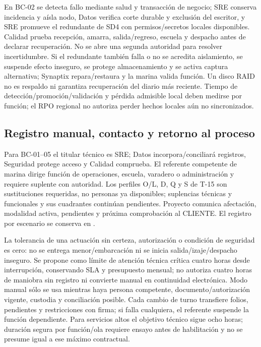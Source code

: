 En BC-02 se detecta fallo mediante salud y transacción de negocio; SRE conserva incidencia y aísla nodo, Datos verifica corte durable y exclusión del escritor, y SRE promueve el redundante de SD4 con permisos/secretos locales disponibles. Calidad prueba recepción, amarra, salida/regreso, escuela y despacho antes de declarar recuperación. No se abre una segunda autoridad para resolver incertidumbre. Si el redundante también falla o no se acredita aislamiento, se suspende efecto inseguro, se protege almacenamiento y se activa captura alternativa; Synaptix repara/restaura y la marina valida función. Un disco RAID no es respaldo ni garantiza recuperación del diario más reciente. Tiempo de detección/promoción/validación y pérdida admisible local deben medirse por función; el RPO regional no autoriza perder hechos locales aún no sincronizados.

\subsection{Registro manual, contacto y retorno al proceso}\label{sec:sd8-bcp-manual-p07}
Para BC-01--05 el titular técnico es SRE; Datos incorpora/conciliará registros, Seguridad protege acceso y Calidad comprueba. El referente competente de marina dirige función de operaciones, escuela, varadero o administración y requiere suplente con autoridad. Los perfiles O/L, D, Q y S de T-15 son sustituciones requeridas, no personas ya disponibles; suplencias técnicas y funcionales y sus cuadrantes continúan pendientes. Proyecto comunica afectación, modalidad activa, pendientes y próxima comprobación al CLIENTE. El registro por escenario se conserva en .

La tolerancia de una actuación sin certeza, autorización o condición de seguridad es cero: no se entrega menor/embarcación ni se inicia salida/izaje/despacho inseguro. Se propone como límite de atención técnica crítica cuatro horas desde interrupción, conservando SLA y presupuesto mensual; no autoriza cuatro horas de maniobra sin registro ni convierte manual en continuidad electrónica. Modo manual sólo se usa mientras haya persona competente, documento/autorización vigente, custodia y conciliación posible. Cada cambio de turno transfiere folios, pendientes y restricciones con firma; si falla cualquiera, el referente suspende la función dependiente. Para servicios altos el objetivo técnico sigue ocho horas; duración segura por función/ola requiere ensayo antes de habilitación y no se presume igual a ese máximo contractual.


